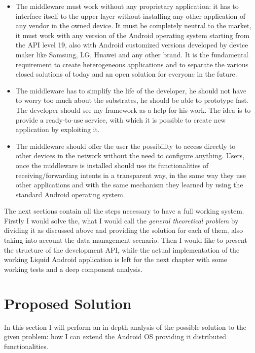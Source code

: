 \begin{itemize}
	\item The middleware must work without any proprietary application: it has to interface itself to the upper layer without installing any other application of any vendor in the owned device. It must be completely neutral to the market, it must work with any version of the Android operating system starting from the API level 19, also with Android customized versions developed by device maker like Samsung, LG, Huawei and any other brand. It is the fundamental requirement to create heterogeneous applications and to separate the various closed solutions of today and an open solution for everyone in the future.
	\item The middleware has to simplify the life of the developer, he should not have to worry too much about the substrates, he should be able to prototype fast. The developer should see my framework as a help for his work. The idea is to provide a ready-to-use service, with which it is possible to create new application by exploiting it.
	\item The middleware should offer the user the possibility to access directly to other devices in the network without the need to configure anything. Users, once the middleware is installed should use its functionalities of receiving/forwarding intents in a transparent way, in the same way they use other applications and with the same mechanism they learned by using the standard Android operating system.
\end{itemize}
The next sections contain all the steps necessary to have a full working system.
Firstly I would solve the, what I would call the \textit{general theoretical problem} by dividing it as discussed above and providing the solution for each of them, also taking into account the data management scenario. Then I would like to present the structure of the development API, while the actual implementation of the working Liquid Android application is left for the next chapter with some working tests and a deep component analysis.


\section{Proposed Solution}
\par In this section I will perform an in-depth analysis of the possible solution to the given problem: how I can extend the Android OS providing it distributed functionalities.
